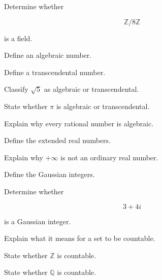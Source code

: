 \begin{exercise}[2]
Determine whether

\[
\mathbb{Z}/8\mathbb{Z}
\]

is a field.
\end{exercise}

\begin{exercise}[2]
Define an algebraic number.
\end{exercise}

\begin{exercise}[2]
Define a transcendental number.
\end{exercise}

\begin{exercise}[2]
Classify \(\sqrt5\) as algebraic or transcendental.
\end{exercise}

\begin{exercise}[2]
State whether \(\pi\) is algebraic or transcendental.
\end{exercise}

\begin{exercise}[3]
Explain why every rational number is algebraic.
\end{exercise}

\begin{exercise}[2]
Define the extended real numbers.
\end{exercise}

\begin{exercise}[2]
Explain why \(+\infty\) is not an ordinary real number.
\end{exercise}

\begin{exercise}[2]
Define the Gaussian integers.
\end{exercise}

\begin{exercise}[3]
Determine whether

\[
3+4i
\]

is a Gaussian integer.
\end{exercise}

\begin{exercise}[2]
Explain what it means for a set to be countable.
\end{exercise}

\begin{exercise}[2]
State whether \(\mathbb{Z}\) is countable.
\end{exercise}

\begin{exercise}[2]
State whether \(\mathbb{Q}\) is countable.
\end{exercise}

